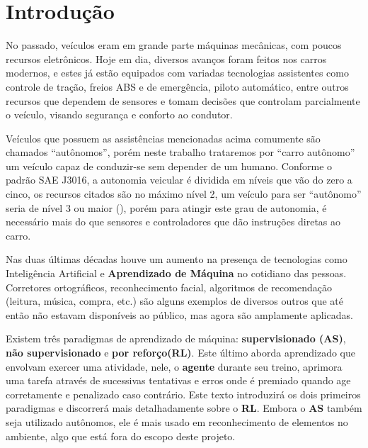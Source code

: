 
\chapter*[Introdução]{Introdução}

No passado, veículos eram em grande parte máquinas mecânicas, com poucos recursos eletrônicos. Hoje em dia, diversos avanços foram feitos nos carros modernos, e estes já estão equipados com variadas tecnologias assistentes como controle de tração, freios ABS e de emergência, piloto automático, entre outros recursos que dependem de sensores e tomam decisões que controlam parcialmente o veículo, visando segurança e conforto ao condutor. 

Veículos que possuem as assistências mencionadas acima comumente são chamados ``autônomos'', porém neste trabalho trataremos por ``carro autônomo'' um veículo capaz de conduzir-se sem depender de um humano. Conforme o padrão SAE J3016, a autonomia veicular é dividida em níveis que vão do zero a cinco, os recursos citados são no máximo nível 2, um veículo para ser ``autônomo'' seria de nível 3 ou maior (), porém para atingir este grau de autonomia, é necessário mais do que sensores e controladores que dão instruções diretas ao carro.

Nas duas últimas décadas houve um aumento na presença de tecnologias como Inteligência Artificial e \textbf{Aprendizado de Máquina} no cotidiano das pessoas. Corretores ortográficos, reconhecimento facial, algoritmos de recomendação (leitura, música, compra, etc.) são alguns exemplos de diversos outros que até então não estavam disponíveis ao público, mas agora são amplamente aplicadas. 

Existem três paradigmas de aprendizado de máquina: \textbf{supervisionado (AS)}, \textbf{não supervisionado} e \textbf{por reforço(RL)}. Este último aborda aprendizado que envolvam exercer uma atividade, nele, o \textbf{agente} durante seu treino, aprimora uma tarefa através de sucessivas tentativas e erros onde é premiado quando age corretamente e penalizado caso contrário. Este texto introduzirá os dois primeiros paradigmas e discorrerá mais detalhadamente sobre o \textbf{RL}. Embora o \textbf{AS} também seja utilizado autônomos, ele é mais usado em reconhecimento de elementos no ambiente, algo que está fora do escopo deste projeto.

